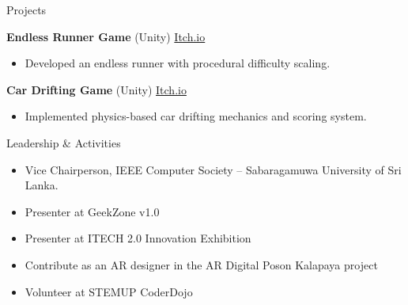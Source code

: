 \documentclass{resume} %
\begin{document}
\begin{rSection}{Projects}
\item \textbf{Endless Runner Game} (Unity) \hfill \href{https://sachindu-nethmin.itch.io/runner-of-the-maze}{Itch.io}
\begin{itemize}
    \itemsep -3pt {}
    \item Developed an endless runner with procedural difficulty scaling.
\end{itemize}

\item \textbf{Car Drifting Game} (Unity) \hfill \href{https://sachindu-nethmin.itch.io/rivals}{Itch.io}
\begin{itemize}
    \itemsep -3pt {}
    \item Implemented physics-based car drifting mechanics and scoring system.
\end{itemize}
\end{rSection}

\begin{rSection}{Leadership \& Activities}
\begin{itemize}
    \itemsep -3pt {}
    \item Vice Chairperson, IEEE Computer Society – Sabaragamuwa University of Sri Lanka.
    \item Presenter at GeekZone v1.0
    \item Presenter at ITECH 2.0 Innovation Exhibition
    \item Contribute as an AR designer in the AR Digital Poson Kalapaya project
    \item Volunteer at STEMUP CoderDojo
\end{itemize}
\end{rSection}
\end{document}
